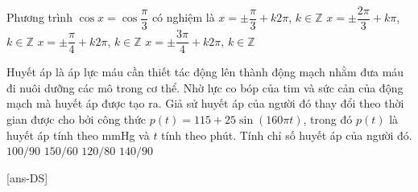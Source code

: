 \begin{ex}%
	Phương trình $\cos x=\cos \dfrac{\pi}{3}$ có nghiệm là
	\choice
	{\True $x=\pm \dfrac{\pi}{3}+k2\pi$, $k\in \mathbb{Z}$}
	{$x=\pm \dfrac{2\pi}{3}+k\pi$, $k\in \mathbb{Z}$}
	{$x=\pm \dfrac{\pi}{4}+k2\pi$, $k\in \mathbb{Z}$}
	{$x=\pm \dfrac{3\pi}{4}+k2\pi$, $k\in \mathbb{Z}$}
\end{ex}

\begin{ex}%
	Huyết áp là áp lực máu cần thiết tác động lên thành động mạch nhằm đưa máu đi nuôi dưỡng các mô trong cơ thể. Nhờ lực co bóp của tim và sức cản của động mạch mà huyết áp được tạo ra. Giả sử huyết áp của người đó thay đổi theo thời gian  được cho bởi công thức $p(t)=115+25\sin(160\pi t)$, trong đó $p(t)$ là huyết áp tính theo mmHg và $t$ tính theo phút. Tính chỉ số huyết áp của người đó.
	\choice
	{$100/90$}
	{$150/60$}
	{$120/80$}
	{\True $140/90$}
\end{ex}




\cauds

[ans-DS]

